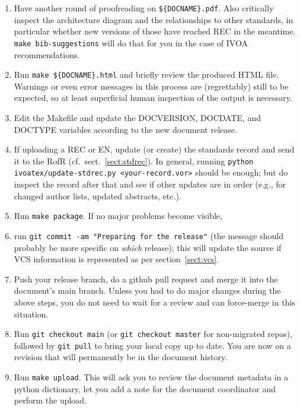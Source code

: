 \documentclass[11pt,a4paper]{ivoa}
\begin{document}
\begin{enumerate}
\item Have another round of proofreading on \verb|${DOCNAME}.pdf|.  Also
critically inspect the architecture diagram and the relationships to
other standards, in particular whether new versions of those have
reached REC in the meantime. \verb|make bib-suggestions| will do
that for you in the case of IVOA recommendations.

\item Run \verb|make ${DOCNAME}.html| and briefly review the produced
HTML file.  Warnings or even error messages in this process are
(regrettably) still to be expected, so at least superficial human inspection
of the output is necessary.

\item Edit the Makefile and update the DOCVERSION, DOCDATE, and DOCTYPE
variables according to the new document release.

\item If uploading a REC or EN, update (or create) the standards record
and send it to the RofR (cf.~sect.~\ref{sect:stdrec}).  In general,
running \verb|python ivoatex/update-stdrec.py <your-record.vor>| should
be enough; but do inspect the record after that and see if other updates
are in order (e.g., for changed author lists, updated abstracts, etc.).

\item Run \verb|make package|.  If no major problems become visible,

\item run \verb|git commit -am "Preparing for the release"| (the message
should probably be more specific on \textit{which} release); this
will update the source if VCS information is represented as per
section~\ref{sect:vcs}.

\item Push your release branch, do a github pull request and merge it
into the document's main branch.  Unless you had to do major changes
during the above steps, you do not need to wait for a review and can
force-merge in this situation.

\item Run \verb|git checkout main| (or \verb|git checkout master| for
non-migrated repos), followed by \verb|git pull| to bring your local
copy up to date.  You are now on a revision that will permanently be in
the document history.

\item Run \verb|make upload|.  This will ask you to review the document
metadata in a python dictionary, let you add a note for the document
coordinator and perform the upload.


\end{enumerate}
\end{document}
